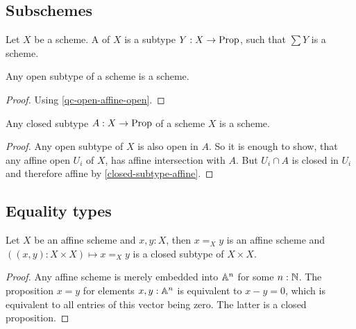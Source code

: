 \subsection{Subschemes}

\begin{definition}
  Let $X$ be a scheme.
  A  of $X$ is a subtype $Y:X\to\mathrm{Prop}$,
  such that $\sum Y$ is a scheme.
\end{definition}

\begin{proposition}%
  \label{open-subscheme}
  Any open subtype of a scheme is a scheme.
\end{proposition}

\begin{proof}
  Using \cref{qc-open-affine-open}.
\end{proof}

\begin{proposition}%
  \label{closed-subscheme}
  Any closed subtype $A:X\to \mathrm{Prop}$ of a scheme $X$ is a scheme.
\end{proposition}

\begin{proof}
  Any open subtype of $X$ is also open in $A$.
  So it is enough to show,
  that any affine open $U_i$ of $X$,
  has affine intersection with $A$.
  But $U_i\cap A$ is closed in $U_i$ and therefore affine by \cref{closed-subtype-affine}.
\end{proof}

\subsection{Equality types}

\begin{lemma}%
  \label{affine-equality-closed}
  Let $X$ be an affine scheme and $x,y:X$,
  then $x=_Xy$ is an affine scheme
  and $((x,y):X\times X)\mapsto x=_Xy$
  is a closed subtype of $X\times X$.
\end{lemma}

\begin{proof}
  Any affine scheme is merely embedded into $\mathbb{A}^n$ for some $n:\mathbb{N}$.
  The proposition $x=y$ for elements $x,y:\mathbb{A}^n$ is equivalent to $x-y=0$,
  which is equivalent to all entries of this vector being zero.
  The latter is a closed proposition.
\end{proof}

